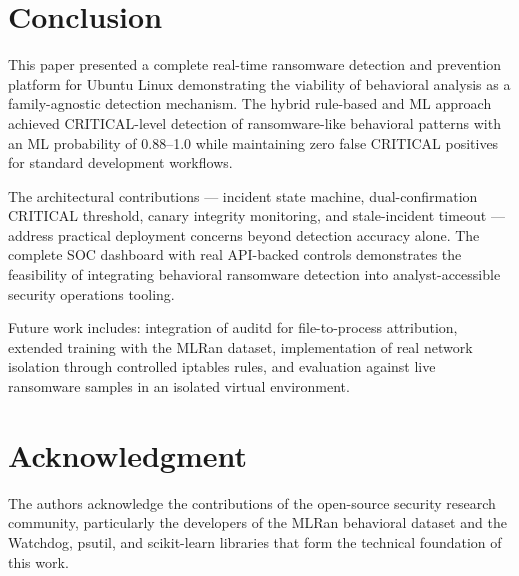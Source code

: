 \documentclass[conference]{IEEEtran}
\begin{document}

\section{Conclusion}

This paper presented a complete real-time ransomware
detection and prevention platform for Ubuntu Linux
demonstrating the viability of behavioral analysis as a
family-agnostic detection mechanism. The hybrid
rule-based and ML approach achieved CRITICAL-level detection
of ransomware-like behavioral patterns with an ML probability
of 0.88--1.0 while maintaining zero false CRITICAL positives
for standard development workflows.

The architectural contributions — incident state machine,
dual-confirmation CRITICAL threshold, canary integrity
monitoring, and stale-incident timeout — address practical
deployment concerns beyond detection accuracy alone. The
complete SOC dashboard with real API-backed controls
demonstrates the feasibility of integrating behavioral
ransomware detection into analyst-accessible security
operations tooling.

Future work includes: integration of auditd for file-to-process
attribution, extended training with the MLRan dataset,
implementation of real network isolation through controlled
iptables rules, and evaluation against live ransomware samples
in an isolated virtual environment.


\section*{Acknowledgment}

The authors acknowledge the contributions of the open-source
security research community, particularly the developers of
the MLRan behavioral dataset and the Watchdog, psutil, and
scikit-learn libraries that form the technical foundation
of this work.

\end{document}
